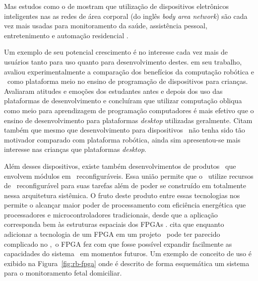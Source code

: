         Mas estudos como o de \citet{cornelius2014wearable} mostram que utilização de dispositivos eletrônicos inteligentes nas as redes de área corporal (do inglês \textit{body area network}) são cada vez mais usadas para monitoramento da saúde, assistência pessoal, entretenimento e automação residencial \citep{cornelius2014wearable}.
        
        
        Um exemplo de seu potencial crescimento é no interesse cada vez mais de usuários tanto para uso quanto para desenvolvimento destes.
        \citet{merkouris2015introducing} em seu trabalho, avaliou experimentalmente a comparação dos benefícios da computação robótica e \wearable\ como plataforma meio no ensino de programação de dispositivos para crianças.
        Avaliaram atitudes e emoções dos estudantes antes e depois dos uso das plataformas de desenvolvimento e concluíram que utilizar computação obliqua como meio para aprendizagem de programação computadores é mais efetivo que o ensino de desenvolvimento para plataformas \textit{desktop} utilizadas geralmente.
        Citam também que mesmo que desenvolvimento para dispositivos \wearable\ não tenha sido tão motivador comparado com plataforma robótica, ainda sim apresentou-se mais interesse nas crianças que plataformas \textit{desktop}.
        
        
        Além desses dispositivos, existe também desenvolvimentos de produtos \wearables\ que envolvem módulos em \hardware\ reconfiguráveis.
        Essa união permite que o \wearable\ utilize recursos de \hardware\ reconfigurável para suas tarefas além de poder se construído em totalmente nessa arquitetura sistêmica.
        O fruto deste produto entre essas tecnologias nos permite o alcançar maior poder de processamento com eficiência energética que processadores e microcontroladores tradicionais, desde que a aplicação corresponda bem às estruturas espaciais dos FPGAs \citep{Plessl2003}.
        \citet{demarco2011real} cita que enquanto adicionar a tecnologia de um FPGA em um projeto \wearable\ pode ter parecido complicado no \design,\ o FPGA fez com que fosse possível expandir facilmente as capacidades do sistema \wearable\ em momentos futuros.
        Um exemplo de conceito de uso é exibido na Figura~\ref{fig:rb-fpga} onde é descrito de forma esquemática um sistema para o monitoramento fetal domiciliar. 
        
